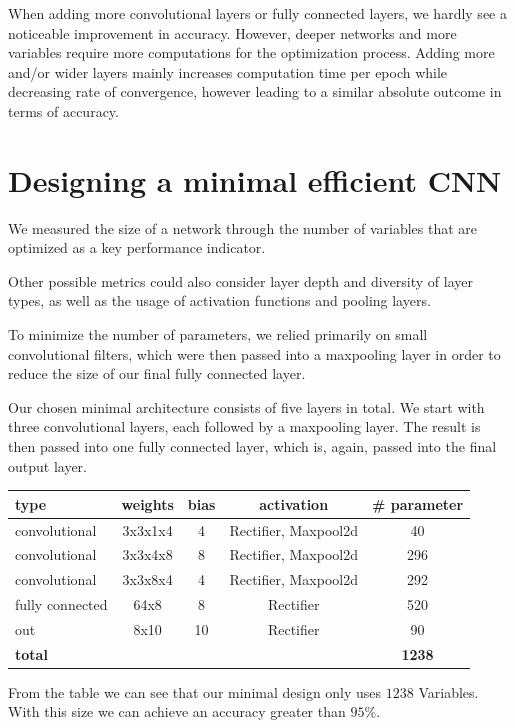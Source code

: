 \documentclass{article}
\begin{document}
When adding more convolutional layers or fully connected layers, we hardly see a noticeable improvement in accuracy. However, deeper networks and more variables require more computations for the optimization process. Adding more and/or wider layers mainly increases computation time per epoch while decreasing rate of convergence, however leading to a similar absolute outcome in terms of accuracy.


\section{Designing a minimal efficient CNN}

We measured the size of a network through the number of variables that are optimized as a key performance indicator.

Other possible metrics could also consider layer depth and diversity of layer types, as well as the usage of activation functions and pooling layers.

To minimize the number of parameters, we relied primarily on small convolutional filters, which were then passed into a maxpooling layer in order to reduce the size of our final fully connected layer.

Our chosen minimal architecture consists of five layers in total. We start with three convolutional layers, each followed by a maxpooling layer. The result is then passed into one fully connected layer, which is, again, passed into the final output layer.

\begin{center}
\begin{tabular}{l c c c c}
 \textbf{type} & \textbf{weights} & \textbf{bias} & \textbf{activation} & \textbf{\# parameter} \\
\midrule
convolutional & 3x3x1x4 & 4  & Rectifier, Maxpool2d & 40 \\
convolutional & 3x3x4x8 & 8 & Rectifier, Maxpool2d & 296 \\
convolutional & 3x3x8x4 & 4 & Rectifier, Maxpool2d & 292 \\
fully connected & 64x8 & 8 & Rectifier & 520 \\
out & 8x10 & 10 & Rectifier & 90 \\
\midrule
\textbf{total} & & & & \textbf{1238}
\end{tabular}
\end{center}

From the table we can see that our minimal design only uses $1238$ Variables. With this size we can achieve an accuracy greater than $95\%$. 
\end{document}
